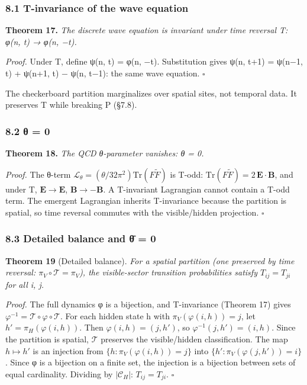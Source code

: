 \documentclass[
  11pt,
]{article}
\begin{document}
\hypertarget{t-invariance-of-the-wave-equation}{%
\subsubsection{8.1 T-invariance of the wave
equation}\label{t-invariance-of-the-wave-equation}}

\textbf{Theorem 17.} \emph{The discrete wave equation is invariant under
time reversal T: φ(n, t) → φ(n, −t).}

\emph{Proof.} Under T, define ψ(n, t) = φ(n, −t). Substitution gives
ψ(n, t+1) = ψ(n−1, t) + ψ(n+1, t) − ψ(n, t−1): the same wave equation.
\(\square\)

The checkerboard partition marginalizes over spatial sites, not temporal
data. It preserves T while breaking P (§7.8).

\hypertarget{ux3b8-0}{%
\subsubsection{8.2 θ = 0}\label{ux3b8-0}}

\textbf{Theorem 18.} \emph{The QCD θ-parameter vanishes: θ = 0.}

\emph{Proof.} The θ-term
\(\mathcal{L}_\theta = (\theta/32\pi^2) \mathrm{Tr}(F \tilde{F})\) is
T-odd: \(\mathrm{Tr}(F\tilde{F}) = 2\,\mathbf{E} \cdot \mathbf{B}\), and
under T, \(\mathbf{E} \to \mathbf{E}\), \(\mathbf{B} \to -\mathbf{B}\).
A T-invariant Lagrangian cannot contain a T-odd term. The emergent
Lagrangian inherits T-invariance because the partition is spatial, so
time reversal commutes with the visible/hidden projection. \(\square\)

\hypertarget{detailed-balance-and-ux3b8-0}{%
\subsubsection{8.3 Detailed balance and θ̄ =
0}\label{detailed-balance-and-ux3b8-0}}

\textbf{Theorem 19} (Detailed balance). \emph{For a spatial partition
(one preserved by time reversal: \(\pi_V \circ \mathcal{T} = \pi_V\)),
the visible-sector transition probabilities satisfy \(T_{ij} = T_{ji}\)
for all i, j.}

\emph{Proof.} The full dynamics φ is a bijection, and T-invariance
(Theorem 17) gives
\(\varphi^{-1} = \mathcal{T} \circ \varphi \circ \mathcal{T}\). For each
hidden state h with \(\pi_V(\varphi(i, h)) = j\), let
\(h' = \pi_H(\varphi(i, h))\). Then \(\varphi(i, h) = (j, h')\), so
\(\varphi^{-1}(j, h') = (i, h)\). Since the partition is spatial,
\(\mathcal{T}\) preserves the visible/hidden classification. The map
\(h \mapsto h'\) is an injection from
\(\{h : \pi_V(\varphi(i,h)) = j\}\) into
\(\{h' : \pi_V(\varphi(j,h')) = i\}\). Since φ is a bijection on a
finite set, the injection is a bijection between sets of equal
cardinality. Dividing by \(|\mathcal{C}_H|\): \(T_{ij} = T_{ji}\).
\(\square\)
\end{document}
